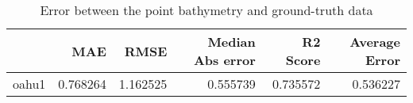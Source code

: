 \begin{table}[h!]
\centering
\caption{Error between the point bathymetry and ground-truth data}
\label{tab:oahu1_lidar_error}
\begin{tabular}{lrrrrr}
\toprule
 & MAE & RMSE & Median Abs error & R2 Score & Average Error \\
\midrule
oahu1 & 0.768264 & 1.162525 & 0.555739 & 0.735572 & 0.536227 \\
\bottomrule
\end{tabular}
\end{table}
